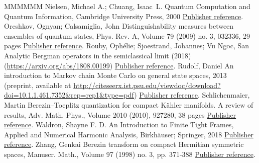 \documentclass[11pt]{article}
\theoremstyle{definition}
\numberwithin{equation}{section}
\numberwithin{figure}{section}
\numberwithin{table}{section}
\newcommand\< {\mathcal{h}}
\renewcommand\> {\mathcal{i}}
\begin{document}
\begin{thebibliography}{MMMMMM}
 Nielsen, Michael A.; Chuang, Isaac L. Quantum Computation and Quantum Information, Cambridge University Press, 2000 \href{https://ahl.centre-mersenne.org/item/AHL_2020__3__1343_0/#NC}{Publisher reference}.
 Oreshkov, Ognyan; Calsamiglia, John Distinguishability measures between ensembles of quantum states, Phys. Rev. A, Volume 79 (2009) no. 3, 032336, 29 pages \href{https://ahl.centre-mersenne.org/item/AHL_2020__3__1343_0/#OC}{Publisher reference}.
 Rouby, Ophélie; Sjoestrand, Johannes; Vu Ngoc, San Analytic Bergman operators in the semiclassical limit (2018) (\url{https://arxiv.org/abs/1808.00199}) \href{https://ahl.centre-mersenne.org/item/AHL_2020__3__1343_0/#Rouby}{Publisher reference}.
 Rudolf, Daniel An introduction to Markov chain Monte Carlo on general state spaces, 2013 (preprint, available at \url{http://citeseerx.ist.psu.edu/viewdoc/download?doi=10.1.1.461.7352&rep=rep1&type=pdf}) \href{https://ahl.centre-mersenne.org/item/AHL_2020__3__1343_0/#Ru}{Publisher reference}.
 Schlichenmaier, Martin Berezin–Toeplitz quantization for compact Kähler manifolds. A review of results, Adv. Math. Phys., Volume 2010 (2010), 927280, 38 pages \href{https://ahl.centre-mersenne.org/item/AHL_2020__3__1343_0/#S}{Publisher reference}.
 Waldron, Shayne F. D. An Introduction to Finite Tight Frames, Applied and Numerical Harmonic Analysis, Birkhäuser; Springer, 2018 \href{https://ahl.centre-mersenne.org/item/AHL_2020__3__1343_0/#W}{Publisher reference}.
 Zhang, Genkai Berezin transform on compact Hermitian symmetric spaces, Manuscr. Math., Volume 97 (1998) no. 3, pp. 371-388 \href{https://ahl.centre-mersenne.org/item/AHL_2020__3__1343_0/#gap-representations}{Publisher reference}.
\end{thebibliography}
\end{document}
